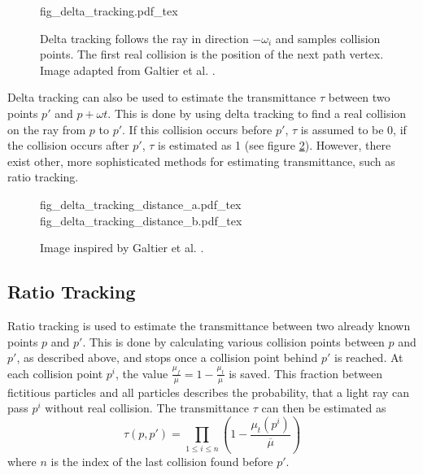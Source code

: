 \begin{figure}
\centering
\def\svgwidth{\columnwidth}
{fig_delta_tracking.pdf_tex}

\caption{Delta tracking follows the ray in direction $-\omega_i$ and samples collision points. The first real collision is the position of the next path vertex. Image adapted from Galtier et al. \cite{GALTIER201357}.}
\label{fig:delta_tracking}
\end{figure}


Delta tracking can also be used to estimate the transmittance $\tau$ between two points $p'$ and $p + \omega t$\cite{10.1145/2661229.2661292}. This is done by using delta tracking to find a real collision on the ray from $p$ to $p'$. If this collision occurs before $p'$, $\tau$ is assumed to be 0, if the collision occurs after $p'$, $\tau$ is estimated as 1 (see figure \ref{fig:delta_tracking_distance}). However, there exist other, more sophisticated methods for estimating transmittance, such as ratio tracking.

\begin{figure}

\fontsize{7}{9}\selectfont
    \def\svgwidth{.48\columnwidth}
    {fig_delta_tracking_distance_a.pdf_tex}
    \hfill
    \def\svgwidth{.48\columnwidth}
    {fig_delta_tracking_distance_b.pdf_tex}


\caption{Image inspired by Galtier et al. \cite{GALTIER201357}.} \label{fig:delta_tracking_distance}
\end{figure}


\subsection{Ratio Tracking}
Ratio tracking \cite{10.1145/2661229.2661292} is used to estimate the transmittance between two already known points $p$ and $p'$. This is done by calculating various collision points between $p$ and $p'$, as described above, and stops once a collision point behind $p'$ is reached. At each collision point $p^i$, the value $\frac{\mu_f}{\overline{\mu}} = 1 - \frac{\mu_t}{\overline{\mu}}$ is saved. This fraction between fictitious particles and all particles describes the probability, that a light ray can pass $p^i$ without real collision. The transmittance $\tau$ can then be estimated as 
\begin{equation}
\tau(p,p') = \prod_{1 \le i \le n}(1 - \frac{\mu_t(p^i)}{\overline{\mu}})
\end{equation}
where $n$ is the index of the last collision found before $p'$.
